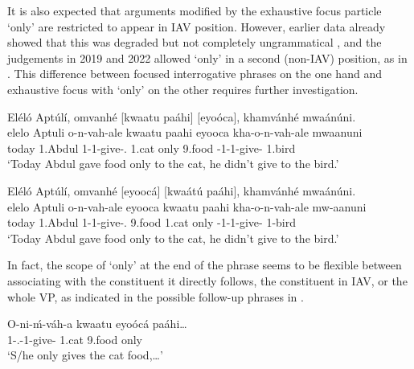 \documentclass[output=paper]{langscibook}
\begin{document}
\z
\z

It is also expected that arguments modified by the exhaustive focus particle ‘only’ are restricted to appear in IAV position. However, earlier data already showed that this was degraded but not completely ungrammatical \citep[226]{vanderWal2009a}, and the judgements in 2019 and 2022 allowed ‘only’ in a second (non-IAV) position, as in . This difference between focused interrogative phrases on the one hand and exhaustive focus with ‘only’ on the other requires further investigation.\largerpage[2]

\ea
\label{bkm:Ref95379118}
\ea
Eléló Aptúlí, omvanhé [kwaatu paáhi] [eyoóca], khamvánhé mwaánúni.\\
\gll
elelo  Aptuli  o-n-vah-ale  kwaatu  paahi  eyooca   kha-o-n-vah-ale  mwaanuni\\
today  1.Abdul  1\SM{}-1\OM{}-give-\PFV{}.\CJ{}  1.cat  only  9.food  \NEG{}-1\SM{}-1\OM{}-give-\PFV{}  1.bird\\
\glt
‘Today Abdul gave food only to the cat, he didn’t give to the bird.’

\ex
Eléló Aptúlí, omvanhé [eyoocá] [kwaátú paáhi], khamvánhé mwaánúni.\\
\gll
elelo  Aptuli  o-n-vah-ale  eyooca  kwaatu  paahi     kha-o-n-vah-ale  mw-aanuni\\
today  1.Abdul  1\SM{}-1\OM{}-give-\PFV{}.\CJ{}  9.food  1.cat  only  \NEG{}-1\SM{}-1\OM{}-give-\PFV{}  1-bird\\
\glt ‘Today Abdul gave food only to the cat, he didn’t give to the bird.’


\z
\z

In fact, the scope of ‘only’ at the end of the phrase seems to be flexible between associating with the constituent it directly follows, the constituent in IAV, or the whole VP, as indicated in the possible follow-up phrases in .

\ea
\label{bkm:Ref117580342}
\gll
O-ni-ḿ-váh-a  kwaatu  eyoócá  paáhi…\\
1\SM{}-\PRS{}.\CJ{}-1\OM{}-give-\FV{}  1.cat  9.food  only\\
\glt
‘S/he only gives the cat food,…’\\
\end{document}
